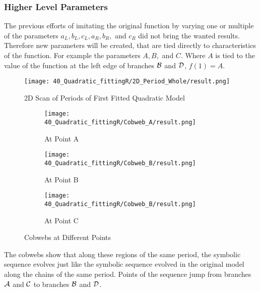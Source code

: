 \subsubsection{Higher Level Parameters}

The previous efforts of imitating the original function by varying one or multiple of the parameters $a_L, b_L, c_L, a_R, b_R,$ and $c_R$ did not bring the wanted results.
Therefore new parameters will be created, that are tied directly to characteristics of the function.
For example the parameters $A, B,$ and $C$.
Where $A$ is tied to the value of the function at the left edge of branches $\mathcal{B}$ and $\mathcal{D}$, $f(1) = A$.



\begin{figure}
    \centering
    \texttt{[image: 40\_Quadratic\_fittingR/2D\_Period\_Whole/result.png]}
    \caption{2D Scan of Periods of First Fitted Quadratic Model}
    \label{fig:quadratic.full.fit.1.Period}
\end{figure}


\begin{figure}
    \centering
    \begin{subfigure}{0.3\textwidth}
        \centering
        \texttt{[image: 40\_Quadratic\_fittingR/Cobweb\_A/result.png]}
        \caption{At Point A}
        \label{fig:quad.full.fit.1.CobwebA}
    \end{subfigure}
    \begin{subfigure}{0.3\textwidth}
        \centering
        \texttt{[image: 40\_Quadratic\_fittingR/Cobweb\_B/result.png]}
        \caption{At Point B}
        \label{fig:quad.full.fit.1.CobwebB}
    \end{subfigure}
    \begin{subfigure}{0.3\textwidth}
        \centering
        \texttt{[image: 40\_Quadratic\_fittingR/Cobweb\_B/result.png]}
        \caption{At Point C}
        \label{fig:quad.full.fit.1.CobwebC}
    \end{subfigure}
    \caption{Cobwebs at Different Points}
    \label{fig:quad.full.fit.1.Cobwebs}
\end{figure}

The cobwebs show that along these regions of the same period, the symbolic sequence evolves just like the symbolic sequence evolved in the original model along the chains of the same period.
Points of the sequence jump from branches $\mathcal{A}$ and $\mathcal{C}$ to branches $\mathcal{B}$ and $\mathcal{D}$.



